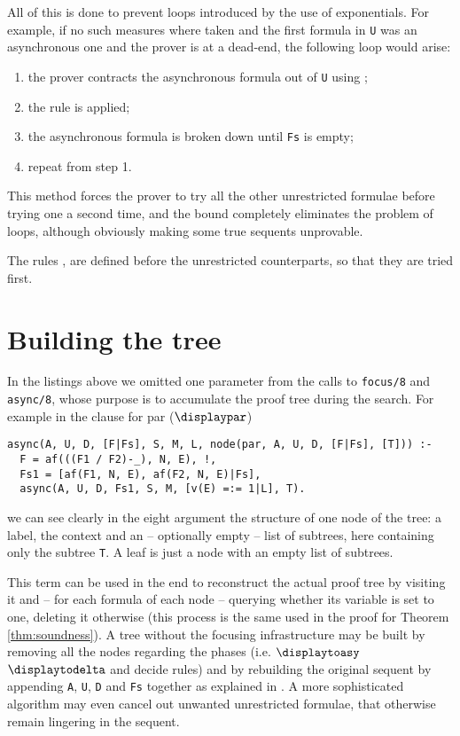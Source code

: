 All of this is done to prevent loops introduced by the use of exponentials.
For example, if no such measures where taken and the first formula in \texttt{U} was an asynchronous one and the prover is at a dead-end, the following loop would arise:
\begin{enumerate}
	\item the prover contracts the asynchronous formula out of \texttt{U} using \derRule{\displaydecide[2]};
	\item the rule \derRule{\displaytoasy} is applied;
	\item the asynchronous formula is broken down until \texttt{Fs} is empty;
	\item repeat from step 1.
\end{enumerate}
This method forces the prover to try all the other unrestricted formulae before trying one a second time, and the bound completely eliminates the problem of loops, although obviously making some true sequents unprovable.

The rules \derRule{\displaydecide[1]}, \derRule{\displayid[1]} are defined before the unrestricted counterparts, so that they are tried first.

\section{Building the tree}
In the listings above we omitted one parameter from the calls to \texttt{focus/8} and \texttt{async/8}, whose purpose is to accumulate the proof tree during the search.
For example in the clause for par ($\displaypar$)
\begin{verbatim}
async(A, U, D, [F|Fs], S, M, L, node(par, A, U, D, [F|Fs], [T])) :- 
  F = af(((F1 / F2)-_), N, E), !,
  Fs1 = [af(F1, N, E), af(F2, N, E)|Fs],
  async(A, U, D, Fs1, S, M, [v(E) =:= 1|L], T).
\end{verbatim}
we can see clearly in the eight argument the structure of one node of the tree: a label, the context and an -- optionally empty -- list of subtrees, here containing only the subtree \texttt{T}.
A leaf is just a node with an empty list of subtrees.

This term can be used in the end to reconstruct the actual proof tree by visiting it and -- for each formula of each node -- querying whether its variable is set to one, deleting it otherwise (this process is the same used in the proof for Theorem \ref{thm:soundness}).
A tree without the focusing infrastructure may be built by removing all the nodes regarding the phases (i.e. $\displaytoasy$ $\displaytodelta$ and decide rules) and by rebuilding the original sequent by appending \texttt{A}, \texttt{U}, \texttt{D} and \texttt{Fs} together as explained in \cite{Focusing}. 
A more sophisticated algorithm may even cancel out unwanted unrestricted formulae, that otherwise remain lingering in the sequent.

